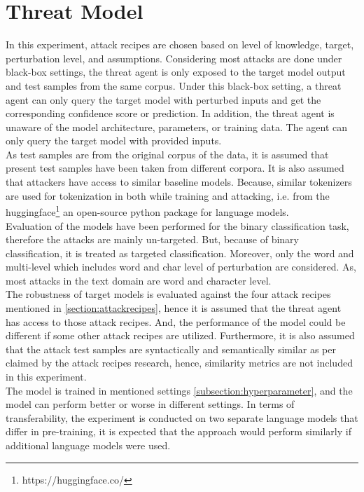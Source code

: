 \documentclass[%
	BCOR=8mm, %
	DIV=12,
	toc=bibliography, %
	toc=listof, %
	oneside, %
	egregdoesnotlikesansseriftitles, %
	]{scrbook}
\begin{document}
\section{Threat Model}
\label{section:threadmodel}
In this experiment, attack recipes are chosen based on level of knowledge, target, perturbation level, and assumptions. Considering most attacks are done under black-box settings, the threat agent is only exposed to the target model output and test samples from the same corpus. Under this black-box setting, a threat agent can only query the target model with perturbed inputs and get the corresponding confidence score or prediction. In addition, the threat agent is unaware of the model architecture, parameters, or training data. The agent can only query the target model with provided inputs. \\
As test samples are from the original corpus of the data, it is assumed that present test samples have been taken from different corpora. It is also assumed that attackers have access to similar baseline models. Because, similar tokenizers are used for tokenization in both while training and attacking, i.e. from the huggingface\footnote{https://huggingface.co/} an open-source python package for language models.\\
Evaluation of the models have been performed for the binary classification task, therefore the attacks are mainly un-targeted. But, because of binary classification, it is treated as targeted classification. Moreover, only the word and multi-level which includes word and char level of perturbation are considered. As, most attacks in the text domain are word and character level.\\
The robustness of target models is evaluated against the four attack recipes mentioned in \ref{section:attackrecipes}, hence it is assumed that the threat agent has access to those attack recipes. And, the performance of the model could be different if some other attack recipes are utilized. Furthermore, it is also assumed that the attack test samples are syntactically and semantically similar as per claimed by the attack recipes research, hence, similarity metrics are not included in this experiment.\\
 The model is trained in mentioned settings  \ref{subsection:hyperparameter}, and the model can perform better or worse in different settings. In terms of transferability, the experiment is conducted on two separate language models that differ in pre-training, it is expected that the approach would perform similarly if additional language models were used. 
\end{document}
